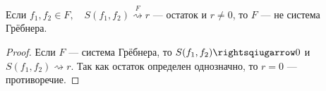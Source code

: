 \begin{corollary}
    Если $f_1, f_2 \in F, \quad S(f_1, f_2) \overset{F}{\rightsquigarrow} r$ --- остаток и $r \neq 0$, то $F$ --- не система Грёбнера. 
\end{corollary}

\begin{proof}
    Если $F$ --- система Грёбнера, то $S(f_1, f_2) \rightsqiugarrow 0$ и $S(f_1, f_2) \rightsquigarrow r$.
    Так как остаток определен однозначно, то $r = 0$ --- противоречие.
\end{proof}
